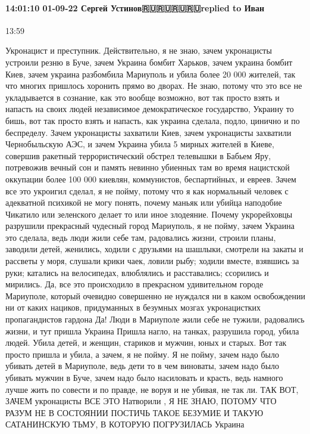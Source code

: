  
 
 
 
 

\paragraph{14:01:10 01-09-22 Сергей Устинов🇷🇺🇷🇺🇷🇺🇷🇺replied to Иван}
13:59

Укронацист и преступник. Действительно, я не знаю, зачем укронацисты устроили
резню в Буче, зачем Украина бомбит Харьков, зачем украина бомбит Киев, зачем
украина разбомбила Мариуполь и убила более 20 000 жителей, так что многих
пришлось хоронить прямо во дворах. Не знаю, потому что это все не укладывается
в сознание, как это вообще возможно, вот так просто взять и напасть на своих
людей независимое демократическое государство, Украину то бишь, вот так просто
взять и напасть, как украина сделала, подло, цинично и по беспределу. Зачем
укронацисты захватили Киев, зачем укронацисты захватили Чернобыльскую АЭС, и
зачем Украина убила 5 мирных жителей в Киеве, совершив ракетный
террористический обстрел телевышки в Бабьем Яру, потревожив вечный сон и память
невинно убиенных там во время нацистской оккупации более 100 000 киевлян,
коммунистов, беспартийных, и евреев.  Зачем все это укроигил сделал, я не
пойму, потому что я как нормальный человек с адекватной психикой не могу
понять, почему маньяк или убийца наподобие Чикатило или зеленского делает то
или иное злодеяние. Почему укрорейховцы разрушили прекрасный чудесный город
Мариуполь, я не пойму, зачем Украина это сделала, ведь люди жили себе там,
радовались жизни, строили планы, заводили детей, женились, ходили с друзьями на
шашлыки, смотрели на закаты и рассветы у моря, слушали крики чаек, ловили рыбу;
ходили вместе, взявшись за руки; катались на велосипедах, влюблялись и
расставались; ссорились и мирились. Да, все это происходило в прекрасном
удивительном городе Мариуполе, который очевидно совершенно не нуждался ни в
каком освобождении ни от каких нациков, придуманных в безумных мозгах
укронацистких пропагандистов гардона Да!  Люди в Мариуполе жили себе не тужили,
радовались жизни, и тут пришла Украина Пришла нагло, на танках, разрушила
город, убила людей. Убила детей, и женщин, стариков и мужчин, юных и старых.
Вот так просто пришла и убила, а зачем, я не пойму. Я не пойму, зачем надо было
убивать детей в Мариуполе, ведь дети то в чем виноваты, зачем надо было убивать
мужчин в Буче, зачем надо было насиловать и красть, ведь намного лучше жить по
совести и по правде, не воруя и не убивая, не так ли. ТАК ВОТ, ЗАЧЕМ
укронацисты ВСЕ ЭТО Натворили , Я НЕ ЗНАЮ, ПОТОМУ ЧТО РАЗУМ НЕ В СОСТОЯНИИ
ПОСТИЧЬ ТАКОЕ БЕЗУМИЕ И ТАКУЮ САТАНИНСКУЮ ТЬМУ, В КОТОРУЮ ПОГРУЗИЛАСЬ Украина
